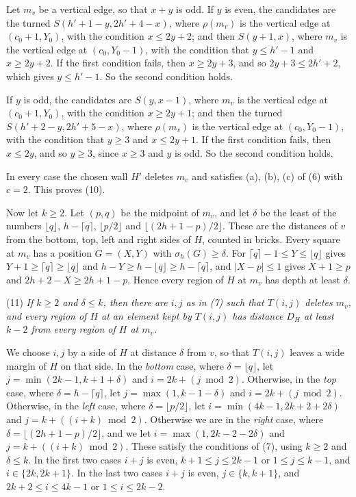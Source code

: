 {Let $m_v$ be a vertical edge, so that $x + y$ is odd. If $y$ is even, the candidates are the turned $S(h' + 1 - y, 2h' + 4 - x)$, where $\rho(m_v)$ is the vertical edge at $(c_0 + 1, Y_0)$, with the condition $x \le 2y + 2$; and then $S(y + 1, x)$, where $m_v$ is the vertical edge at $(c_0, Y_0 - 1)$, with the condition that $y \le h' - 1$ and $x \ge 2y + 2$. If the first condition fails, then $x \ge 2y + 3$, and so $2y + 3 \le 2h' + 2$, which gives $y \le h' - 1$. So the second condition holds.

If $y$ is odd, the candidates are $S(y, x - 1)$, where $m_v$ is the vertical edge at $(c_0 + 1, Y_0)$, with the condition $x \ge 2y + 1$; and then the turned $S(h' + 2 - y, 2h' + 5 - x)$, where $\rho(m_v)$ is the vertical edge at $(c_0, Y_0 - 1)$, with the condition that $y \ge 3$ and $x \le 2y + 1$. If the first condition fails, then $x \le 2y$, and so $y \ge 3$, since $x \ge 3$ and $y$ is odd. So the second condition holds.

In every case the chosen wall $H'$ deletes $m_v$ and satisfies (a), (b), (c) of (6) with $c = 2$. This proves (10).

Now let $k \ge 2$. Let $(p, q)$ be the midpoint of $m_v$, and let $\delta$ be the least of the numbers $\lfloor q \rfloor$, $h - \lceil q \rceil$, $\lfloor p/2 \rfloor$ and $\lfloor (2h + 1 - p)/2 \rfloor$. These are the distances of $v$ from the bottom, top, left and right sides of $H$, counted in bricks. Every square at $m_v$ has a position $G = (X, Y)$ with $\sigma_h(G) \ge \delta$. For $\lceil q \rceil - 1 \le Y \le \lfloor q \rfloor$ gives $Y + 1 \ge \lceil q \rceil \ge \lfloor q \rfloor$ and $h - Y \ge h - \lfloor q \rfloor \ge h - \lceil q \rceil$, and $|X - p| \le 1$ gives $X + 1 \ge p$ and $2h + 2 - X \ge 2h + 1 - p$. Hence every region of $H$ at $m_v$ has depth at least $\delta$.

\hspace*{12pt}(11) \textit{If $k \ge 2$ and $\delta \le k$, then there are $i, j$ as in (7) such that $T(i, j)$ deletes $m_v$, and every region of $H$ at an element kept by $T(i, j)$ has distance $D_H$ at least $k - 2$ from every region of $H$ at $m_v$.}

We choose $i, j$ by a side of $H$ at distance $\delta$ from $v$, so that $T(i, j)$ leaves a wide margin of $H$ on that side. In the \textit{bottom} case, where $\delta = \lfloor q \rfloor$, let $j = \min(2k - 1, k + 1 + \delta)$ and $i = 2k + (j \bmod 2)$. Otherwise, in the \textit{top} case, where $\delta = h - \lceil q \rceil$, let $j = \max(1, k - 1 - \delta)$ and $i = 2k + (j \bmod 2)$. Otherwise, in the \textit{left} case, where $\delta = \lfloor p/2 \rfloor$, let $i = \min(4k - 1, 2k + 2 + 2\delta)$ and $j = k + ((i + k) \bmod 2)$. Otherwise we are in the \textit{right} case, where $\delta = \lfloor (2h + 1 - p)/2 \rfloor$, and we let $i = \max(1, 2k - 2 - 2\delta)$ and $j = k + ((i + k) \bmod 2)$. These satisfy the conditions of (7), using $k \ge 2$ and $\delta \le k$. In the first two cases $i + j$ is even, $k + 1 \le j \le 2k - 1$ or $1 \le j \le k - 1$, and $i \in \{2k, 2k + 1\}$. In the last two cases $i + j$ is even, $j \in \{k, k + 1\}$, and $2k + 2 \le i \le 4k - 1$ or $1 \le i \le 2k - 2$.

}
